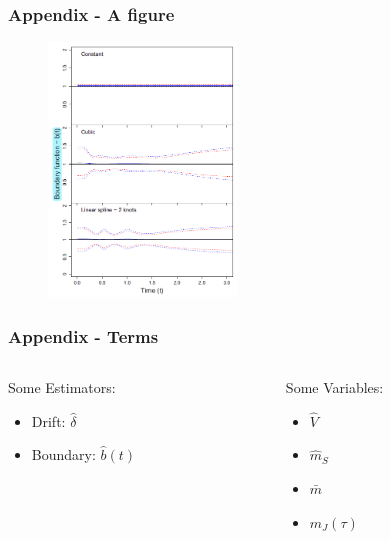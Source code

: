 \documentclass[
    11pt, %
    aspectratio=169, %
]{beamer}
\begin{document}
\begin{frame}[noframenumbering]
\label{Figure}
	\frametitle{Appendix - A figure}
        \hyperlink{Test}{}
        
        \begin{figure}[h!]
            \centering
            \includegraphics[angle=0, width=5cm]{Newey et al Graph.png}
        \end{figure}
\end{frame}

\begin{frame}[noframenumbering]
\label{Terms}
	\frametitle{Appendix - Terms}

        \begin{columns}[t] %
		\begin{column}{0.5\textwidth} %
                Some Estimators:
                \begin{itemize}
                    \item Drift: $\hat{\delta}$
                    \item Boundary: $\hat{b}(t)$
                \end{itemize}
		\end{column}
  		\begin{column}{0.5\textwidth} %
                Some Variables:
                \begin{itemize}
                    \item $\hat{V}$
                    \item $\hat{m}_S$
                    \item $\bar{m}$
                    \item $m_J(\tau)$\newline\newline
                \end{itemize}
		\end{column}
	\end{columns}
        \hyperlink{Test Stat}{}        
\end{frame}
\end{document}
